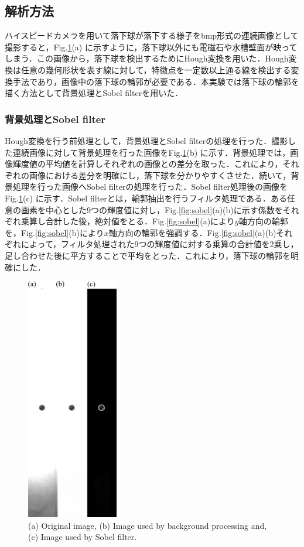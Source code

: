 \subsection{解析方法}
ハイスピードカメラを用いて落下球が落下する様子をbmp形式の連続画像として撮影すると，Fig.\ref{fig:expPhoto}(a) に示すように，落下球以外にも電磁石や水槽壁面が映ってしまう．この画像から，落下球を検出するためにHough変換を用いた．Hough変換は任意の幾何形状を表す線に対して，特徴点を一定数以上通る線を検出する変換手法であり，画像中の落下球の輪郭が必要である．本実験では落下球の輪郭を描く方法として背景処理とSobel filterを用いた．
\subsubsection{背景処理とSobel filter}
Hough変換を行う前処理として，背景処理とSobel filterの処理を行った．撮影した連続画像に対して背景処理を行った画像をFig.\ref{fig:expPhoto}(b) に示す．背景処理では，画像輝度値の平均値を計算しそれぞれの画像との差分を取った．これにより，それぞれの画像における差分を明確にし，落下球を分かりやすくさせた．続いて，背景処理を行った画像へSobel filterの処理を行った．Sobel filter処理後の画像をFig.\ref{fig:expPhoto}(c) に示す．Sobel filterとは，輪郭抽出を行うフィルタ処理である．ある任意の画素を中心とした9つの輝度値に対し，Fig.\ref{fig:sobel}(a)(b)に示す係数をそれぞれ乗算し合計した後，絶対値をとる．Fig.\ref{fig:sobel}(a)により$y$軸方向の輪郭を，Fig.\ref{fig:sobel}(b)により$x$軸方向の輪郭を強調する．Fig.\ref{fig:sobel}(a)(b)それぞれによって，フィルタ処理された9つの輝度値に対する乗算の合計値を2乗し，足し合わせた後に平方することで平均をとった．これにより，落下球の輪郭を明確にした．

\begin{figure}[h]
    \centering
    \includegraphics[width=4.0cm,clip]{2-Methods/exp-img.png}
    \caption{(a) Original image, (b) Image used by background processing and, (c) Image used by Sobel filter.}
    \label{fig:expPhoto}
\end{figure}

